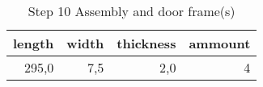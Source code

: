 \begin{table}[h!]
\centering
\caption{Step 10 Assembly and door frame(s)}
\begin{tabular}{rrrr}
\toprule
 length &  width &  thickness &  ammount \\
\midrule
  295,0 &    7,5 &        2,0 &        4 \\
\bottomrule
\end{tabular}
\end{table}
